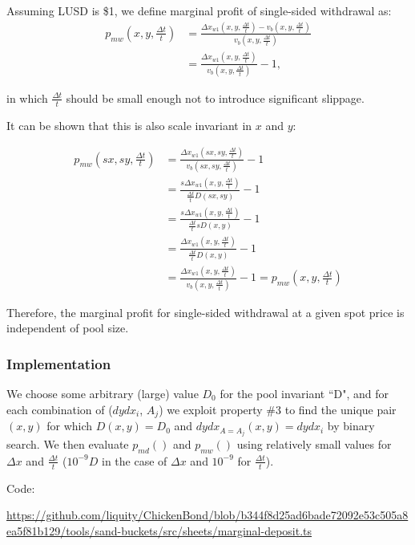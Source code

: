 \documentclass{article}
\begin{document}
Assuming LUSD is \$1, we define marginal profit of single-sided withdrawal as:
\[
\begin{split}
  p_{mw}(x, y, \tfrac{\Delta{t}}{t}) &= \frac{\Delta{x}_{w1}(x, y, \tfrac{\Delta{t}}{t}) - v_b(x, y, \tfrac{\Delta{t}}{t})}{v_b(x, y, \tfrac{\Delta{t}}{t})} \\
  &= \frac{\Delta{x}_{w1}(x, y, \tfrac{\Delta{t}}{t})}{v_b(x, y, \tfrac{\Delta{t}}{t})} - 1,
\end{split}
\]

in which $\tfrac{\Delta{t}}{t}$ should be small enough not to introduce significant slippage.

It can be shown that this is also scale invariant in $x$ and $y$:

\[
\begin{split}
p_{mw}(sx, sy, \tfrac{\Delta{t}}{t}) &= \frac{\Delta{x}_{w1}(sx, sy, \tfrac{\Delta{t}}{t})}{v_b(sx, sy, \tfrac{\Delta{t}}{t})} - 1 \\
  &= \frac{s\Delta{x}_{w1}(x, y, \tfrac{\Delta{t}}{t})}{\tfrac{\Delta{t}}{t} D(sx, sy)} - 1 \\
  &= \frac{s\Delta{x}_{w1}(x, y, \tfrac{\Delta{t}}{t})}{\tfrac{\Delta{t}}{t} sD(x, y)} - 1 \\
  &= \frac{\Delta{x}_{w1}(x, y, \tfrac{\Delta{t}}{t})}{\tfrac{\Delta{t}}{t} D(x, y)} - 1 \\
  &= \frac{\Delta{x}_{w1}(x, y, \tfrac{\Delta{t}}{t})}{v_b(x, y, \tfrac{\Delta{t}}{t})} - 1 = p_{mw}(x, y, \tfrac{\Delta{t}}{t})
\end{split}
\]

Therefore, the marginal profit for single-sided withdrawal at a given spot price is independent of pool size.

\subsubsection{Implementation}

We choose some arbitrary (large) value $D_0$ for the pool invariant ``D", and for each combination of ($dydx_i$, $A_j$) we exploit property \#3 to find the unique pair $(x,y)$ for which $D(x,y)=D_0$ and $dydx_{A=A_j}(x,y)=dydx_i$ by binary search. We then evaluate $p_{md}()$ and $p_{mw}()$ using relatively small values for $\Delta{x}$ and $\tfrac{\Delta{t}}{t}$ ($10^{-9}D$ in the case of $\Delta{x}$ and $10^{-9}$ for $\tfrac{\Delta{t}}{t}$).

Code:

\url{https://github.com/liquity/ChickenBond/blob/b344f8d25ad6bade72092e53c505a8ea5f81b129/tools/sand-buckets/src/sheets/marginal-deposit.ts}
\end{document}
